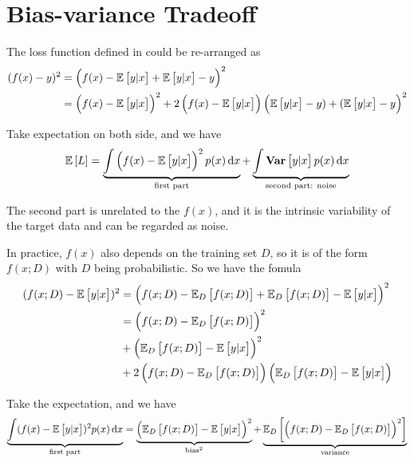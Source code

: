 \section{Bias-variance Tradeoff}

The loss function defined in  could be re-arranged as
\begin{equation}
    \begin{aligned}
        (f(x) - y)^2 &= \left(f(x) - \mathbb{E}\left[{y|x}\right] + \mathbb{E}\left[{y|x}\right] - y\right)^2 \\
        &= \left(f(x) - \mathbb{E}\left[{y|x}\right]\right)^2 + 2 \left(f(x) - \mathbb{E}\left[{y|x}\right]\right)\left(\mathbb{E}\left[{y|x}\right] - y) + (\mathbb{E}\left[{y|x}\right] - y\right)^2
    \end{aligned}
\end{equation}

Take expectation on both side, and we have
\begin{equation}
    \expectation{L} = \underbrace{\int \left(f(x) - \expectation{y|x}\right)^2 p(x) \dif x}_{\text{first part}} + \underbrace{\int \variance{y|x} p(x) \dif x}_{\text{second part: noise}}
\end{equation}

The second part is unrelated to the $f(x)$, and it is the intrinsic variability of the target data and can be regarded as noise. 

In practice, $f(x)$ also depends on the training set $D$, so it is of the form $f(x;D)$ with $D$ being probabilistic. So we have the fomula
\begin{equation}
    \begin{aligned}
        (f(x;D) - \mathbb{E}\left[{y|x}\right])^2 &= \left(f(x;D) - \mathbb{E}_{D}\left[{f(x;D)}\right] + \mathbb{E}_{D}\left[{f(x;D)}\right] - \mathbb{E}\left[{y|x}\right]\right)^2 \\
        &= \left(f(x;D) - \mathbb{E}_{D}\left[{f(x;D)}\right]\right)^2 \\
        &+ \left(\mathbb{E}_{D}\left[{f(x;D)}\right] - \mathbb{E}\left[{y|x}\right]\right)^2 \\
        &+ 2 \left(f(x;D) - \mathbb{E}_{D}\left[{f(x;D)}\right]\right)\left(\mathbb{E}_{D}\left[{f(x;D)}\right] - \mathbb{E}\left[{y|x}\right]\right)
    \end{aligned}
\end{equation}

Take the expectation, and we have
\begin{equation}
    \underbrace{\int (f(x) - \expectation{y|x})^2 p(x) \dif x}_{\text{first part}} = \underbrace{\left(\expectationonanvariable{D}{f(x;D)} - \expectation{y|x}\right)^2}_{\text{bias}^2} + \underbrace{\expectationonanvariable{D}{\left(f(x;D) - \expectationonanvariable{D}{f(x;D)}\right)^2}}_{\text{variance}}
\end{equation}

